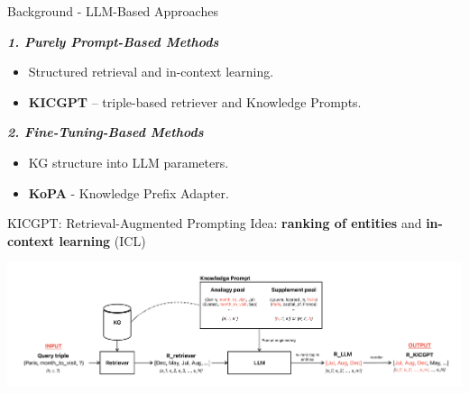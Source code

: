 \documentclass[aspectratio=169,xcolor=dvipsnames]{beamer}
\begin{document}
\begin{frame}{Background - LLM-Based Approaches}

    \vspace{0.2cm}
    \textbf{\textit{1. Purely Prompt-Based Methods}}
    \begin{itemize}
        \item Structured retrieval and in-context learning.
        \item \textbf{KICGPT} – triple-based retriever and Knowledge Prompts.
    \end{itemize}

    \textbf{\textit{2. Fine-Tuning-Based Methods}}
    \begin{itemize}
        \item KG structure into LLM parameters.
        \item \textbf{KoPA} - Knowledge Prefix Adapter.
    \end{itemize}

    \vspace{0.3cm}
    \begin{center}
    \end{center}

\end{frame}

\begin{frame}{KICGPT: Retrieval-Augmented Prompting}
    Idea: \textbf{ranking of entities} and \textbf{in-context learning} (ICL)
    \begin{center}
        \includegraphics[width=1.02\linewidth]{images/KICGPT}
    \end{center}
\end{frame}
\end{document}
